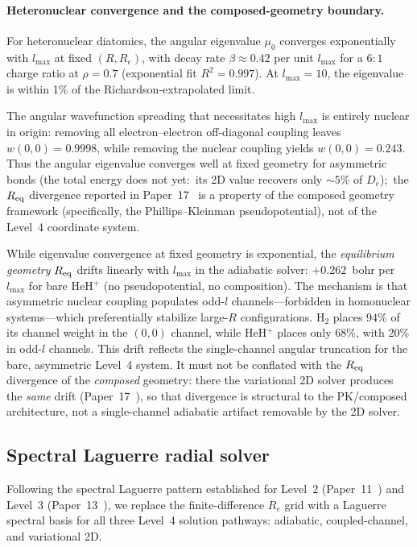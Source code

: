 \documentclass[aps,pra,twocolumn,superscriptaddress,longbibliography]{revtex4-2}
\begin{document}
\paragraph{Heteronuclear convergence and the composed-geometry
boundary.}
For heteronuclear diatomics, the angular eigenvalue $\mu_0$
converges exponentially with $l_{\max}$ at fixed $(R, R_e)$,
with decay rate $\beta \approx 0.42$ per unit $l_{\max}$ for a
$6{:}1$ charge ratio at $\rho = 0.7$ (exponential fit
$R^2 = 0.997$).  At $l_{\max} = 10$, the eigenvalue is within
1\% of the Richardson-extrapolated limit.

The angular wavefunction spreading that necessitates high
$l_{\max}$ is entirely nuclear in origin: removing all
electron--electron off-diagonal coupling leaves
$w(0{,}0) = 0.9998$, while removing the nuclear coupling yields
$w(0{,}0) = 0.243$.  Thus the angular eigenvalue converges well at
fixed geometry for asymmetric bonds (the total energy does not yet:\
its 2D value recovers only ${\sim}5\%$ of $D_e$);\ the $R_{\rm eq}$ divergence reported
in Paper~17~\cite{paper17} is a property of the composed geometry
framework (specifically, the Phillips--Kleinman pseudopotential),
not of the Level~4 coordinate system.

While eigenvalue convergence at fixed geometry is exponential,
the \emph{equilibrium geometry} $R_{\rm eq}$ drifts linearly
with $l_{\max}$ in the adiabatic solver: $+0.262$~bohr per
$l_{\max}$ for bare HeH$^+$ (no pseudopotential, no composition).
The mechanism is that asymmetric nuclear coupling populates odd-$l$
channels---forbidden in homonuclear systems---which preferentially
stabilize large-$R$ configurations.  H$_2$ places 94\% of its
channel weight in the $(0{,}0)$ channel, while HeH$^+$ places only
68\%, with 20\% in odd-$l$ channels.  This drift reflects the single-channel angular truncation for the
bare, asymmetric Level~4 system.  It must not be conflated with the
$R_{\rm eq}$ divergence of the \emph{composed} geometry: there the
variational 2D solver produces the \emph{same} drift
(Paper~17~\cite{paper17}), so that divergence is structural to the
PK/composed architecture, not a single-channel adiabatic artifact
removable by the 2D solver.

\subsection{Spectral Laguerre radial solver}
\label{sec:spectral_radial_l4}

Following the spectral Laguerre pattern established for Level~2
(Paper~11~\cite{loutey_paper11}) and Level~3
(Paper~13~\cite{loutey_paper13}), we replace the finite-difference
$R_e$ grid with a Laguerre spectral basis for all three Level~4
solution pathways: adiabatic, coupled-channel, and variational 2D.
\end{document}

